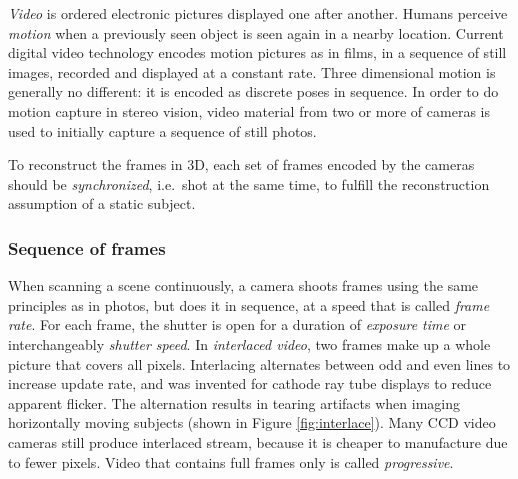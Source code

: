 

\emph{Video} is ordered electronic pictures displayed one after another.
Humans perceive \emph{motion} when a previously seen object is seen again in a nearby location.
Current digital video technology encodes motion pictures as in films, in a sequence of still images, recorded and displayed at a constant rate.
Three dimensional motion is generally no different: it is encoded as discrete poses in sequence.
In order to do motion capture in stereo vision, video material from two or more of cameras is used to initially capture a sequence of still photos.

To reconstruct the frames in 3D, each set of frames encoded by the cameras should be \emph{synchronized}, i.e.\ shot at the same time, to fulfill the reconstruction assumption of a static subject.


\subsubsection{Sequence of frames} %

When scanning a scene continuously, a camera shoots frames using the same principles as in photos, but does it in sequence, at a speed that is called \emph{frame rate}.
For each frame, the shutter is open for a duration of \emph{exposure time} or interchangeably \emph{shutter speed}.
In \emph{interlaced video}, two frames make up a whole picture that covers all pixels.
Interlacing alternates between odd and even lines to increase update rate, and was invented for cathode ray tube displays to reduce apparent flicker.
\cite{poynton1996technical}
The alternation results in tearing artifacts when imaging horizontally moving subjects (shown in Figure \ref{fig:interlace}).
Many CCD video cameras still produce interlaced stream, because it is cheaper to manufacture due to fewer pixels.
Video that contains full frames only is called \emph{progressive}.


